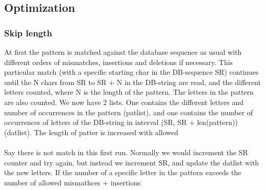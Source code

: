 \documentclass[12pt]{article}
\begin{document}
\subsection{Optimization}
\subsubsection{Skip length}
At first the pattern is matched against the database sequence as usual with different orders of mismatches, insertions and
deletions if necessary. This particular match (with a specific starting char in the DB-sequence SR) continues until
the N chars from SR to SR + N in the DB-string are read, and the different letters counted, where N is the length of the
pattern. The letters in the pattern are also counted. We now have 2 lists. One contains the different letters and number
of occurrences in the pattern (patlist), and one contains the number of occurrences of letters of the DB-string in interval
(SR, SR + len(pattern)) (datlist). The length of patter is increased with allowed  \\ \\
Say there is not match in this first run. Normally we would increment the SR counter and try again, but instead we
increment SR, and update the datlist with the new letters. If the number of a specific letter in the pattern exceeds the
number of allowed mismathces + insertions
\end{document}
